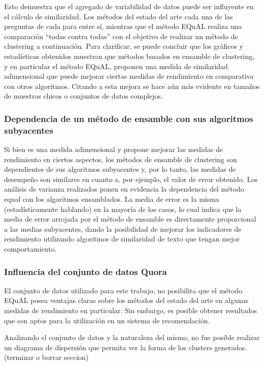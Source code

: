 \bigskip Esto demuestra que el agregado de variabilidad de datos puede ser influyente en el cálculo de similaridad. Los métodos del estado del arte cada una de las preguntas de cada para entre sí, mientras que el método EQuAL realiza una comparación “todas contra todas” con el objetivo de realizar un método de clustering a continuación. Para clarificar, se puede concluir que los gráficos y estadísticas obtenidos muestran que métodos basados en ensamble de clustering, y en particular el método EQuAL,  proponen una medida de similaridad adimensional que puede mejorar ciertas medidas de rendimiento en comparativa con otros algoritmos. Citando a \cite{fred2005combining} esta mejora se hace aún más evidente en tamaños de muestras chicos o conjuntos de datos complejos.

\subsubsection{Dependencia de un método de ensamble con sus algoritmos subyacentes}
Si bien es una medida adimensional y propone mejorar las medidas de rendimiento en ciertos aspectos, los métodos de ensamble de clustering son dependientes de sus algoritmos subyacentes y, por lo tanto, las medidas de desempeño son similares en cuanto a, por ejemplo, el valor de error obtenido. Los análisis de varianza realizados ponen en evidencia la dependencia del método equal con los algoritmos ensamblados. La media de error es la misma (estadísticamente hablando) en la mayoría de los casos, lo cual indica que la media de error arrojada por el método de ensamble es directamente proporcional a las medias subyacentes, dando la posibilidad de mejorar los indicadores de rendimiento utilizando algoritmos de similaridad de texto que tengan mejor comportamiento.

\subsubsection{Influencia del conjunto de datos Quora}
El conjunto de datos utilizado para este trabajo, no posibilita que el método EQuAL posea ventajas claras sobre los métodos del estado del arte en algunas medidas de rendimiento en particular. Sin embargo, es posible obtener resultados que son aptos para la utilización en un sistema de recomendación.

\bigskip Analizando el conjunto de datos y la naturaleza del mismo, no fue posible realizar un diagrama de dispersión que permita ver la forma de los clusters generados.
(terminar o borrar seccion)
